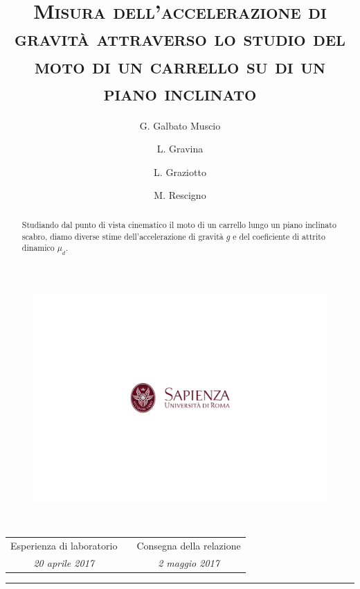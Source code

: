 \documentclass[10pt,oneside,a4paper]{article}
\title{\textsc{Misura dell'accelerazione di gravità attraverso lo studio del moto di un carrello su di un piano inclinato }}
\author{\small{G. Galbato Muscio} \and \small{L. Gravina} \and \small{L. Graziotto} \and \small{M. Rescigno}}
\date{}
\begin{document}
	\begin{figure}
		\centering
		\includegraphics[scale=0.5, trim={2.8cm 8.9cm 0 9cm}, clip]{logo.png}
	\end{figure}
	\maketitle
	\begin{center} 
		 \\
		\vspace{1cm}
		\begin{tabular}{ccc}
			Esperienza di laboratorio && Consegna della relazione \\
			\emph{\small{20 aprile 2017}} && \emph{\small{2 maggio 2017}} \\
		\end{tabular} 
		
		\vspace{0.5cm}
		
	\end{center}
\hrule
\vspace{0.5cm}
\begin{abstract}
	Studiando dal punto di vista cinematico il moto di un carrello lungo un piano inclinato scabro, diamo diverse stime dell'accelerazione di gravità $g$ e del coeficiente di attrito dinamico $\mu_d$.
\end{abstract}
\newpage
\tableofcontents %
\listoftables %
\listoffigures %
\pagebreak
\end{document}
